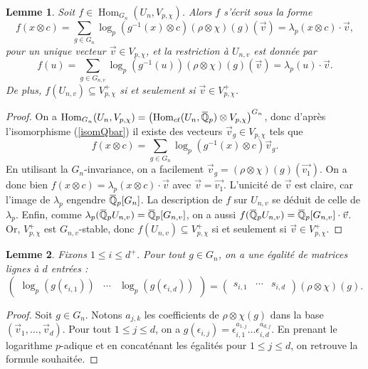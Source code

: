 \documentclass[10pt,a4paper]{amsart}
\newtheorem{lemme}{Lemme}
\DeclareMathOperator{\Hom}{Hom}
\newcommand\bQ{\mathbb{Q}}
\newcommand{\ob}[1]{\mkern 1.5mu\overline{\mkern-1.5mu#1\mkern-1.5mu}\mkern 1.5mu}
\begin{document}
\begin{lemme}\label{lem:description_morphismes_Qpbar}
	Soit $f \in \Hom_{G_n}(U_n,V_{p,\chi})$. Alors $f$ s'écrit sous la forme 
	$$f(x\otimes c) = \sum_{g \in G_n} \log_p \left(g^{-1}(x)\otimes c \right)\left(\rho\otimes\chi\right)(g)(\vec{v}) = \lambda_p(x\otimes c) \cdot \vec{v}, $$ 
	pour un unique vecteur $\vec{v}\in V_{p,\chi}$, et la restriction à $U_{n,v}$ est donnée par 
	$$f(u) = \sum_{g\in G_{n,v}}  \log_p\left(g^{-1}(u)\right)\left(\rho\otimes\chi\right)(g)(\vec{v}) = \lambda_p(u)\cdot \vec{v}. $$
	De plus, $f(U_{n,v}) \subseteq V_{p,\chi}^+$ si et seulement si $\vec{v}\in V_{p,\chi}^+$.
\end{lemme}
\begin{proof}
	On a $\Hom_{G_n}(U_n,V_{p,\chi}) = \left(\Hom_{\textrm{ct}}(U_n,\ob{\bQ}_p) \otimes V_{p,\chi} \right)^{G_n}$, donc d'après l'isomorphisme (\ref{isomQbar}) il existe des vecteurs $\vec{v}_g \in V_{p,\chi}$ tels que 
	$$f(x\otimes c) = \sum_{g \in G_n} \log_p \left(g^{-1}(x)\otimes c \right)\vec{v}_g.$$
	En utilisant la $G_n$-invariance, on a facilement $\vec{v}_g = \left(\rho\otimes\chi\right)(g)(\vec{v_1})$. 
	On a donc bien $f(x\otimes c) = \lambda_p(x\otimes c) \cdot \vec{v}$ avec $\vec{v}=\vec{v_1}$. 
	L'unicité de $\vec{v}$ est claire, car l'image de $\lambda_p$ engendre $\ob{\bQ}_p[G_n]$. 
	La description de $f$ sur $U_{n,v}$ se déduit de celle de $\lambda_p$. 
	Enfin, comme $\lambda_p(\ob{\bQ}_p U_{n,v})=\ob{\bQ}_p[G_{n,v}]$, on a aussi $f(\ob{\bQ}_p U_{n,v}) = \ob{\bQ}_p[G_{n,v}] \cdot \vec{v}$. 
	Or, $V_{p,\chi}^+$ est $G_{n,v}$-stable, donc $f(U_{n,v}) \subseteq V_{p,\chi}^+$ si et seulement si $\vec{v}\in V_{p,\chi}^+$.
\end{proof}

\begin{lemme}\label{lem:calcul_matriciel}
	Fixons $1\leq i\leq d^+$. Pour tout $g\in G_n$, on a une égalité de matrices lignes à $d$ entrées : 
	$$\begin{pmatrix} \log_p\left(g(\epsilon_{i,1})\right) & \cdots &\log_p\left(g(\epsilon_{i,d})\right)\end{pmatrix}=\begin{pmatrix}
	s_{i,1} & \cdots &  s_{i,d}
	\end{pmatrix} \left(\rho\otimes\chi\right)(g).$$
\end{lemme}
\begin{proof}
	Soit $g\in G_n$. Notons $a_{j,k}$ les coefficients de $\rho\otimes\chi(g)$ dans la base $(\vec{v}_1,\ldots,\vec{v}_d)$. Pour tout $1\leq j\leq d$, on a $g(\epsilon_{i,j})=\epsilon_{i,1}^{a_{1,j}} \ldots \epsilon_{i,d}^{a_{d,j}}$. En prenant le logarithme $p$-adique et en concaténant les égalités pour $1\leq j\leq d$, on retrouve la formule souhaitée.
\end{proof}
\end{document}
